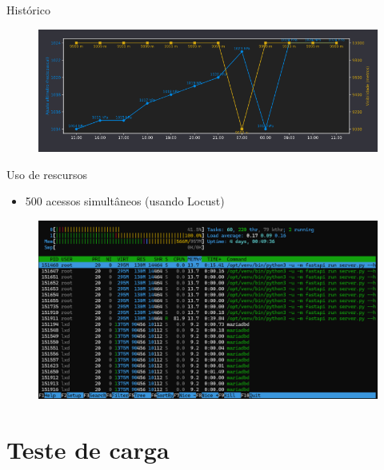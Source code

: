 \documentclass{beamer}
\begin{document}
\begin{frame}{Histórico}
    \begin{figure}[ht]
        \begin{center}
        \includegraphics[width=0.9\linewidth]{img/history-2.png}
        \label{fig:UI}
        \end{center}
    \end{figure}
\end{frame}

\begin{frame}{Uso de rescursos}
    \begin{itemize}
        \item 500 acessos simultâneos (usando Locust)
    \end{itemize}
    
    \begin{figure}[ht]
        \begin{center}
        \includegraphics[width=0.8\linewidth]{img/server-500-acessos.png}
        \label{fig:arquitetura}
        \end{center}
    \end{figure}
\end{frame}

\section{Teste de carga}
\end{document}
